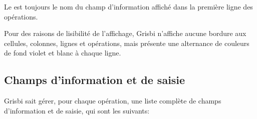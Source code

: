 Le  est toujours le nom du champ d'information affiché dans la première ligne des opérations.

Pour des raisons de lisibilité de l'affichage, Grisbi n'affiche aucune bordure aux cellules, colonnes, lignes et opérations, mais présente une alternance de couleurs de \colorbox[RGB]{215,215,255}{fond violet} et blanc à chaque ligne.


\subsection{Champs d'information et de saisie\label{transactions-list-fields}}

Grisbi sait gérer, pour chaque opération, une liste complète de champs d'information et de saisie, qui sont les suivants:

